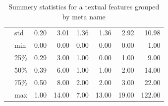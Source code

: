\begin{table}[h]
\begin{center}
\begin{tabular}{llrrrrrr}
            & std &         0.20 &       3.01 &       1.36 &       1.36 &       2.92 &      10.98 \\
            & min &         0.00 &       0.00 &       0.00 &       0.00 &       0.00 &       1.00 \\
            & 25\% &         0.29 &       3.00 &       1.00 &       0.00 &       1.00 &       9.00 \\
            & 50\% &         0.39 &       6.00 &       1.00 &       1.00 &       2.00 &      14.00 \\
            & 75\% &         0.50 &       8.00 &       2.00 &       2.00 &       3.00 &      22.00 \\
            & max &         1.00 &      14.00 &       7.00 &      13.00 &      19.00 &     122.00 \\
\bottomrule
\end{tabular}

\caption{Summery statistics for a textual features grouped by meta name}
\label{table:textualDistr}
\end{center}
\end{table}      




\label{append}